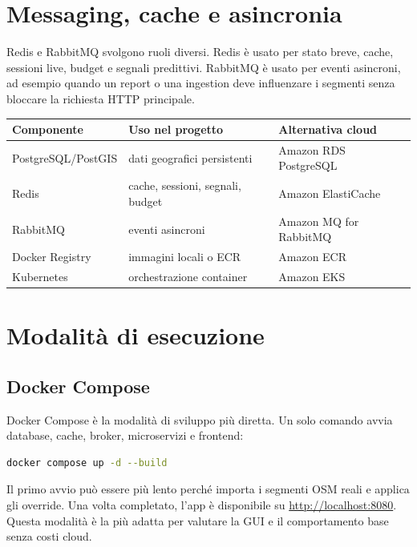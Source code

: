 \documentclass[11pt,a4paper]{article}
\begin{document}
\section{Messaging, cache e asincronia}

Redis e RabbitMQ svolgono ruoli diversi. Redis \`e usato per stato breve, cache, sessioni live, budget e segnali predittivi. RabbitMQ \`e usato per eventi asincroni, ad esempio quando un report o una ingestion deve influenzare i segmenti senza bloccare la richiesta HTTP principale.

\begin{center}
\begin{tabular}{@{}lll@{}}
\toprule
Componente & Uso nel progetto & Alternativa cloud \\
\midrule
PostgreSQL/PostGIS & dati geografici persistenti & Amazon RDS PostgreSQL \\
Redis & cache, sessioni, segnali, budget & Amazon ElastiCache \\
RabbitMQ & eventi asincroni & Amazon MQ for RabbitMQ \\
Docker Registry & immagini locali o ECR & Amazon ECR \\
Kubernetes & orchestrazione container & Amazon EKS \\
\bottomrule
\end{tabular}
\end{center}

\section{Modalit\`a di esecuzione}

\subsection{Docker Compose}

Docker Compose \`e la modalit\`a di sviluppo pi\`u diretta. Un solo comando avvia database, cache, broker, microservizi e frontend:

\begin{lstlisting}[language=bash]
docker compose up -d --build
\end{lstlisting}

Il primo avvio pu\`o essere pi\`u lento perch\'e importa i segmenti OSM reali e applica gli override. Una volta completato, l'app \`e disponibile su \url{http://localhost:8080}. Questa modalit\`a \`e la pi\`u adatta per valutare la GUI e il comportamento base senza costi cloud.
\end{document}
